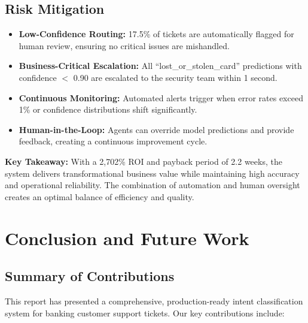 \documentclass[12pt,a4paper]{article}
\begin{document}
\subsection{Risk Mitigation}
\label{subsec:risk}

\begin{itemize}[leftmargin=*]
    \item \textbf{Low-Confidence Routing:} 17.5\% of tickets are automatically flagged for human review, ensuring no critical issues are mishandled.
    \item \textbf{Business-Critical Escalation:} All ``lost\_or\_stolen\_card'' predictions with confidence $<$ 0.90 are escalated to the security team within 1 second.
    \item \textbf{Continuous Monitoring:} Automated alerts trigger when error rates exceed 1\% or confidence distributions shift significantly.
    \item \textbf{Human-in-the-Loop:} Agents can override model predictions and provide feedback, creating a continuous improvement cycle.
\end{itemize}

\begin{tipbox}
\textbf{Key Takeaway:} With a 2,702\% ROI and payback period of 2.2 weeks, the system delivers transformational business value while maintaining high accuracy and operational reliability. The combination of automation and human oversight creates an optimal balance of efficiency and quality.
\end{tipbox}

\newpage
\section{Conclusion and Future Work}
\label{sec:conclusion}

\subsection{Summary of Contributions}
\label{subsec:summary}

This report has presented a comprehensive, production-ready intent classification system for banking customer support tickets. Our key contributions include:
\end{document}
